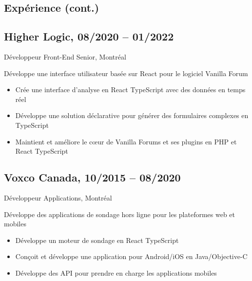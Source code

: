 \documentclass{article}
\begin{document}
\begin{paracol}{2}
\begin{rightcolumn}
    \pagebreak
    \section{Expérience (cont.)}

    \subsection{Higher Logic, 08/2020 -- 01/2022}  
    {Développeur Front-End Senior, Montréal\par}  
    {  
      Développe une interface utilisateur basée sur React pour le logiciel Vanilla Forum
    \par}  
    \begin{itemize}  
      \item Crée une interface d’analyse en React TypeScript avec des données en temps réel  
      \item Développe une solution déclarative pour générer des formulaires complexes en TypeScript  
      \item Maintient et améliore le cœur de Vanilla Forums et ses plugins en PHP et React TypeScript  
    \end{itemize}  

    \vspace{1em}  

    \subsection{Voxco Canada, 10/2015 -- 08/2020}  
    {Développeur Applications, Montréal\par}  
    {  
      Développe des applications de sondage hors ligne pour les plateformes web et mobiles  
    \par}  
    \begin{itemize}  
      \item Développe un moteur de sondage en React TypeScript  
      \item Conçoit et développe une application pour Android/iOS en Java/Objective-C  
      \item Développe des API pour prendre en charge les applications mobiles  
    \end{itemize}  


\end{rightcolumn}
\end{paracol}
\end{document}
